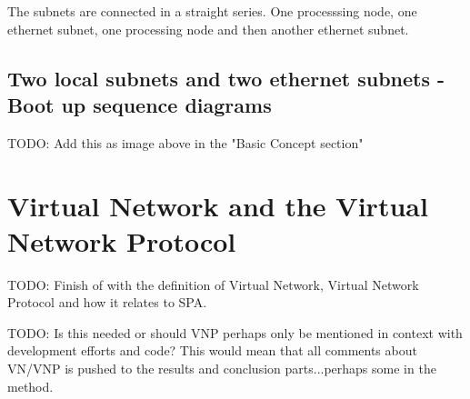 The subnets are connected in a straight series. One processsing node, one
ethernet subnet, one processing node and then another ethernet subnet.

\subsection{Two local subnets and two ethernet subnets - Boot up sequence diagrams}
TODO: Add this as image above in the "Basic Concept section"

\section{Virtual Network and the Virtual Network Protocol}
TODO: Finish of with the definition of Virtual Network, Virtual Network
Protocol and how it relates to SPA.

TODO: Is this needed or should VNP perhaps only be mentioned in context with
development efforts and code? This would mean that all comments about VN/VNP is
pushed to the results and conclusion parts...perhaps some in the method.
